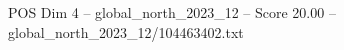 \begin{textsample}{POS Dim 4 – global\_north\_2023\_12 – Score 20.00 – global\_north\_2023\_12/104463402.txt}
\end{textsample}
